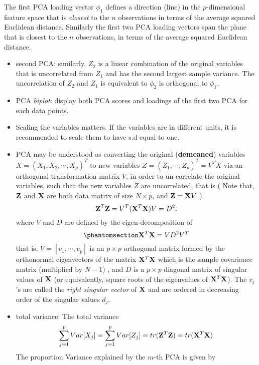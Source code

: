 \documentclass[
  letterpaper,
  DIV=11,
  numbers=noendperiod]{scrreprt}
\begin{document}
The first PCA loading vector \(\phi_1\) defines a direction (line) in
the \(p\)-dimensional feature space that is \emph{closest} to the \(n\)
observations in terms of the average squared Euclidean distance.
Similarly the first two PCA loading vectors span the plane that is
closest to the \(n\) observations, in terms of the average squared
Euclidean distance.

\begin{itemize}
\item
  second PCA: similarly, \(Z_2\) is a linear combination of the original
  variables that is uncorrelated from \(Z_1\) and has the second largest
  sample variance. The uncorrelation of \(Z_2\) and \(Z_1\) is
  equivalent to \(\phi_2\) is orthogonal to \(\phi_1\).
\item
  PCA \emph{biplot}: display both PCA scores and loadings of the first
  two PCA for each data points.
\item
  Scaling the variables matters. If the variables are in different
  units, it is recommended to scale them to have s.d equal to one.
\item
  PCA may be understood as converting the original (\textbf{demeaned})
  variables \(X=(X_1, X_2, \cdots, X_p)^T\) to new variables
  \(Z=(Z_1, \cdots, Z_p)^T=V^TX\) via an orthogonal transformation
  matrix \(V\), in order to un-correlate the original variables, such
  that the new variables \(Z\) are uncorrelated, that is ( Note that,
  \({\bf Z}\) and \({\bf X}\) are both data matrix of size
  \(N\times p\), and \({\bf Z}={\bf X}V\) ) \[
  {\bf Z}^T{\bf Z} = V^T({\bf X}^T{\bf X})V= D^2. 
  \] where \(V\) and \(D\) are defined by the eigen-decomposition of
  \begin{equation}\phantomsection\label{eq-eigen-decom}{
  {\bf X}^T{\bf X}=VD^2V^T
  }\end{equation} that is, \(V=[v_1, \cdots, v_p]\) is an \(p\times p\)
  orthogonal matrix formed by the orthonormal eigenvectors of the matrix
  \({\bf X}^T{\bf X}\) which is the sample covariance matrix (multiplied
  by \(N-1\)) , and \(D\) is a \(p\times p\) diagonal matrix of singular
  values of \({\bf X}\) (or equivalently, square roots of the
  eigenvalues of \({\bf X}^T{\bf X}\)). The \(v_j\)'s are called the
  \emph{right singular vector} of \({\bf X}\) and are ordered in
  decreasing order of the singular values \(d_j\).
\item
  total variance: The total variance \[
  \sum_{j=1}^p Var[X_j] = \sum_{j=1}^pVar[Z_j]=tr({\bf Z}^T{\bf Z})=tr({\bf X}^T{\bf X})
  \] The proportion Variance explained by the \(m\)-th PCA is given by

\end{itemize}
\end{document}
